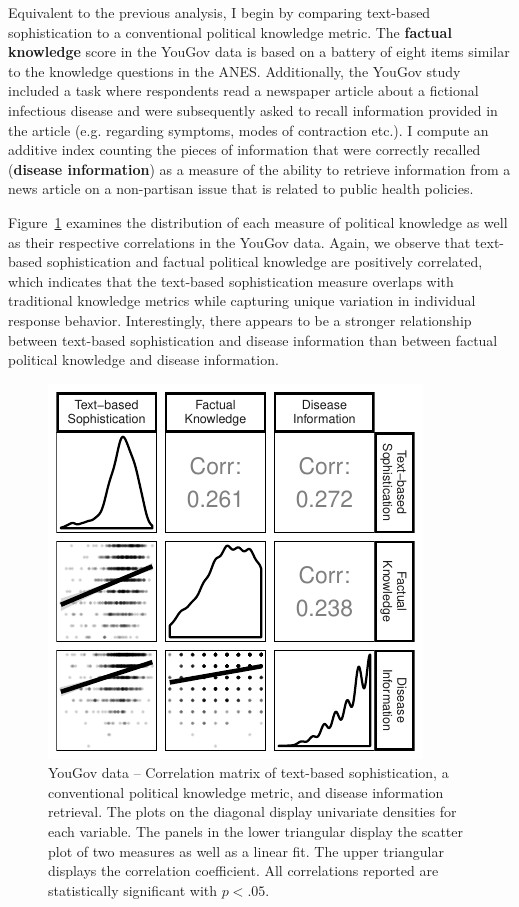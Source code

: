 \documentclass[12pt]{article}
\begin{document}
Equivalent to the previous analysis, I begin by comparing text-based sophistication to a conventional political knowledge metric. The \textbf{factual knowledge} score in the YouGov data is based on a battery of eight items similar to the knowledge questions in the ANES. Additionally, the YouGov study included a task where respondents read a newspaper article about a fictional infectious disease and were subsequently asked to recall information provided in the article (e.g. regarding symptoms, modes of contraction etc.). I compute an additive index counting the pieces of information that were correctly recalled (\textbf{disease information}) as a measure of the ability to retrieve information from a news article on a non-partisan issue that is related to public health policies.

Figure~\ref{fig:yg_corplot} examines the distribution of each measure of political knowledge as well as their respective correlations in the YouGov data. Again, we observe that text-based sophistication and factual political knowledge are positively correlated, which indicates that the text-based sophistication measure overlaps with traditional knowledge metrics while capturing unique variation in individual response behavior. Interestingly, there appears to be a stronger relationship between text-based sophistication and disease information than between factual political knowledge and disease information.

\begin{figure}[h]\centering
\includegraphics{../fig/yg_corplot.pdf}
\caption{YouGov data -- Correlation matrix of text-based sophistication, a conventional political knowledge metric, and disease information retrieval. The plots on the diagonal display univariate densities for each variable. The panels in the lower triangular display the scatter plot of two measures as well as a linear fit. The upper triangular displays the correlation coefficient. All correlations reported are statistically significant with $p<.05$.}\label{fig:yg_corplot}
\end{figure}
\end{document}
